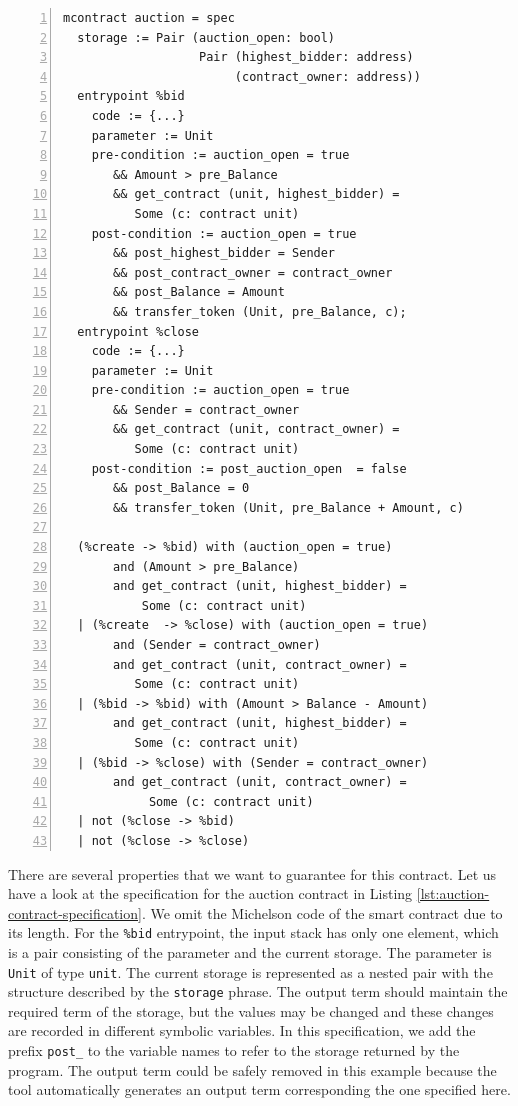 \documentclass[a4paper,USenglish,cleveref, autoref, thm-restate]{lipics-v2021}
\begin{document}
\begin{lstlisting}[float=tp,captionpos=b,caption={Auction contract specification},label={lst:auction-contract-specification},numbers=left]
mcontract auction = spec 
  storage := Pair (auction_open: bool) 
                   Pair (highest_bidder: address)
                        (contract_owner: address))
  entrypoint %bid
    code := {...}
    parameter := Unit 
    pre-condition := auction_open = true
       && Amount > pre_Balance
       && get_contract (unit, highest_bidder) = 
          Some (c: contract unit)
    post-condition := auction_open = true
       && post_highest_bidder = Sender 
       && post_contract_owner = contract_owner 
       && post_Balance = Amount 
       && transfer_token (Unit, pre_Balance, c);
  entrypoint %close
    code := {...}
    parameter := Unit
    pre-condition := auction_open = true
       && Sender = contract_owner  
       && get_contract (unit, contract_owner) = 
          Some (c: contract unit)              
    post-condition := post_auction_open  = false
       && post_Balance = 0 
       && transfer_token (Unit, pre_Balance + Amount, c) 

  (%create -> %bid) with (auction_open = true)  
       and (Amount > pre_Balance) 
       and get_contract (unit, highest_bidder) = 
           Some (c: contract unit)
  | (%create  -> %close) with (auction_open = true) 
       and (Sender = contract_owner)
       and get_contract (unit, contract_owner) = 
          Some (c: contract unit)
  | (%bid -> %bid) with (Amount > Balance - Amount) 
       and get_contract (unit, highest_bidder) = 
          Some (c: contract unit)
  | (%bid -> %close) with (Sender = contract_owner) 
       and get_contract (unit, contract_owner) = 
            Some (c: contract unit)
  | not (%close -> %bid)
  | not (%close -> %close)
\end{lstlisting}

There are several properties that we want to guarantee for this
contract. Let us have a look at the specification for the auction
contract in Listing \ref{lst:auction-contract-specification}. We omit
the Michelson code of the smart contract due to its length.  For the
\lstinline/%bid/ entrypoint, the input stack has only one element,
which is a pair consisting of the parameter and the current
storage. The parameter is \lstinline/Unit/ of type \lstinline/unit/.
The current storage is represented as a nested pair with the
structure described by the \lstinline|storage| phrase. 
The output term should maintain the required term of the storage,
but the values may be changed and these changes are recorded in
different symbolic variables. In this specification, we add the prefix
\lstinline/post_/ to the variable names to refer to the storage
returned by the program. The output term could be safely removed in
this example because the tool automatically generates an output
term corresponding the one specified here.
\end{document}
